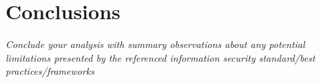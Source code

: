\section{Conclusions}
	 \textit{Conclude your analysis with summary observations about any potential limitations presented by the referenced information security standard/best practices/frameworks}